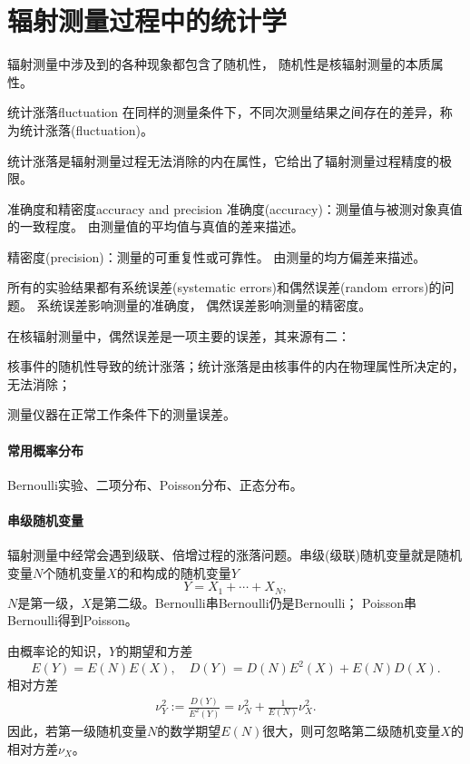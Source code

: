 \clearpage
\section{辐射测量过程中的统计学}
辐射测量中涉及到的各种现象都包含了随机性，
随机性是核辐射测量的本质属性。

\begin{definition}{统计涨落}{fluctuation}
	在同样的测量条件下，不同次测量结果之间存在的差异，称为统计涨落(fluctuation)。
\end{definition}
统计涨落是辐射测量过程无法消除的内在属性，它给出了辐射测量过程精度的极限。
\begin{definition}{准确度和精密度}{accuracy and precision}
	准确度(accuracy)：测量值与被测对象真值的一致程度。
	由测量值的平均值与真值的差来描述。

	精密度(precision)：测量的可重复性或可靠性。
	由测量的均方偏差来描述。	
\end{definition}
所有的实验结果都有系统误差(systematic errors)和偶然误差(random errors)的问题。
系统误差影响测量的准确度，
偶然误差影响测量的精密度。

在核辐射测量中，偶然误差是一项主要的误差，其来源有二：
\begin{compactenum}
	\item 核事件的随机性导致的统计涨落；统计涨落是由核事件的内在物理属性所决定的，无法消除；
	\item 测量仪器在正常工作条件下的测量误差。
\end{compactenum}
\paragraph{常用概率分布}
Bernoulli实验、二项分布、Poisson分布、正态分布。
\paragraph{串级随机变量}
辐射测量中经常会遇到级联、倍增过程的涨落问题。串级(级联)随机变量就是随机变量$N$个随机变量$X$的和构成的随机变量$Y$
\[
	Y=X_1+\cdots+X_N,
\]
$N$是第一级，$X$是第二级。Bernoulli串Bernoulli仍是Bernoulli；
Poisson串Bernoulli得到Poisson。

由概率论的知识，$Y$的期望和方差
\[
	E(Y)=E(N)E(X),\quad D(Y)=D(N)E^2(X)+E(N)D(X).
\]
相对方差
\begin{align}
	\nu_Y^2:=\frac{D(Y)}{E^2(Y)}=\nu_N^2+\frac1{E(N)}\nu_X^2.
\end{align}
因此，若第一级随机变量$N$的数学期望$E(N)$很大，则可忽略第二级随机变量$X$的相对方差$\nu_X$。%

